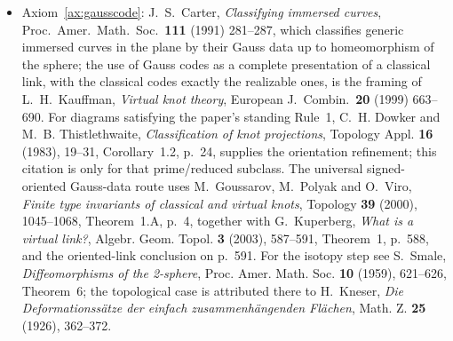 \begin{itemize}
the quantum integers of its Equation~(3.40). Read at the preprint on
2026-08-23. The proof source for the coefficient is E.~Gorsky,
\emph{$q,t$-Catalan numbers and knot homology},
\texttt{arXiv:1003.0916v3}, Theorem~3.1 and its Appendix. Its torus-knot
HOMFLY input is V.~F.~R. Jones, \emph{Hecke algebra representations of braid
groups and link polynomials}, Ann. of Math. \textbf{126} (1987), 335--388,
Theorem~9.7, p.~359, whose proof is printed. The rewriting uses N.~M.
Dunfield, S.~Gukov and J.~Rasmussen, \emph{The superpolynomial for knot
homologies}, Experiment. Math. \textbf{15} (2006), 129--159,
Equations~(69) and~(71), p.~25; the equality of those displays, asserted there
without the intervening algebra, has been verified term by term in a symbolic
derivation on file.
\item Axiom~\ref{ax:gausscode}: J.~S.~Carter, \emph{Classifying immersed
curves}, Proc.\ Amer.\ Math.\ Soc.\ \textbf{111} (1991) 281--287, which
classifies generic immersed curves in the plane by their Gauss data up to
homeomorphism of the sphere; the use of Gauss codes as a complete presentation
of a classical link, with the classical codes exactly the realizable ones, is
the framing of L.~H.~Kauffman, \emph{Virtual knot theory}, European J.\
Combin.\ \textbf{20} (1999) 663--690. For diagrams satisfying the paper's
standing Rule~1, C.~H. Dowker and M.~B. Thistlethwaite, \emph{Classification
of knot projections}, Topology Appl. \textbf{16} (1983), 19--31,
Corollary~1.2, p.~24, supplies the orientation refinement; this citation is
only for that prime/reduced subclass. The universal signed-oriented
Gauss-data route uses M.~Goussarov, M.~Polyak and O.~Viro, \emph{Finite type
invariants of classical and virtual knots}, Topology \textbf{39} (2000),
1045--1068, Theorem~1.A, p.~4, together with G.~Kuperberg, \emph{What is a
virtual link?}, Algebr. Geom. Topol. \textbf{3} (2003), 587--591, Theorem~1,
p.~588, and the oriented-link conclusion on p.~591. For the isotopy step see
S.~Smale, \emph{Diffeomorphisms of the 2-sphere}, Proc. Amer. Math. Soc.
\textbf{10} (1959), 621--626, Theorem~6; the topological case is attributed
there to H.~Kneser, \emph{Die Deformationss\"atze der einfach
zusammenh\"angenden Fl\"achen}, Math. Z. \textbf{25} (1926), 362--372.
\end{itemize}
